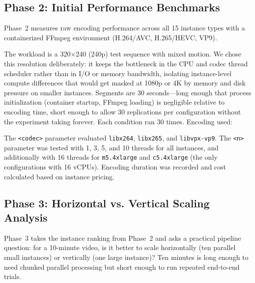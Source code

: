 \documentclass[conference]{IEEEtran}
\begin{document}
\subsection{Phase 2: Initial Performance Benchmarks}

Phase~2 measures raw encoding performance across all 15 instance types with a containerized FFmpeg environment (H.264/AVC, H.265/HEVC, VP9).

The workload is a 320$\times$240 (240p) test sequence with mixed motion. We chose this resolution deliberately: it keeps the bottleneck in the CPU and codec thread scheduler rather than in I/O or memory bandwidth, isolating instance-level compute differences that would get masked at 1080p or 4K by memory and disk pressure on smaller instances. Segments are 30 seconds---long enough that process initialization (container startup, FFmpeg loading) is negligible relative to encoding time, short enough to allow 30 replications per configuration without the experiment taking forever. Each condition ran 30 times. Encoding used:

\begin{center}
	{\ttfamily\scriptsize
	}
\end{center}

The \texttt{<codec>} parameter evaluated \texttt{libx264}, \texttt{libx265},
and \texttt{libvpx-vp9}. The \texttt{<n>} parameter was tested with 1, 3, 5, and 10 threads for all instances, and additionally with 16 threads for \texttt{m5.4xlarge} and \texttt{c5.4xlarge} (the only configurations with 16 vCPUs). Encoding duration was recorded and cost calculated based on
instance pricing.

\subsection{Phase 3: Horizontal vs. Vertical Scaling Analysis}

Phase~3 takes the instance ranking from Phase~2 and asks a practical pipeline question: for a 10-minute video, is it better to scale horizontally (ten parallel small instances) or vertically (one large instance)? Ten minutes is long enough to need chunked parallel processing but short enough to run repeated end-to-end trials.
\end{document}
